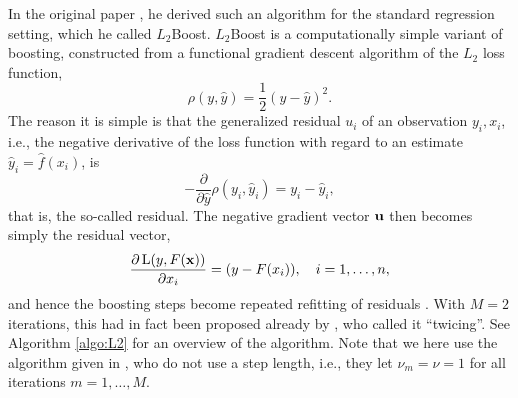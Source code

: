 In the original paper \citep{friedman2001}, he derived such an algorithm for the standard regression setting, which he called $L_2$Boost. $L_2$Boost is a computationally simple variant of boosting, constructed from a functional gradient descent algorithm of the $L_2$ loss function,
\begin{equation*}
    \rho(y, \hat{y})=\frac{1}{2}(y-\hat{y})^2.
\end{equation*}
The reason it is simple is that the generalized residual $u_i$ of an observation $y_i,x_i$, i.e., the negative derivative of the loss function with regard to an estimate $\hat{y}_i=\hat{f}(x_i)$, is
\begin{equation*}
    -\frac{\partial}{\partial\hat{y}}\rho(y_i, \hat{y}_i)=y_i-\hat{y}_i,
\end{equation*}
that is, the so-called residual. The negative gradient vector $\mathbf{u}$ then becomes simply the residual vector,
\begin{equation*}
    \frac{\partial\operatorname{L}(y,F(\mathbf{x}))}{\partial x_i}=(y-F(x_i)),\quad i=1,\dotsc,n,
\end{equation*}
and hence the boosting steps become repeated refitting of residuals \citep{friedman2001,buhlmann-yu}. With $M=2$ iterations, this had in fact been proposed already by \citep{tukey}, who called it ``twicing''. See Algorithm \ref{algo:L2} for an overview of the algorithm. Note that we here use the algorithm given in \citet{buhlmann-yu}, who do not use a step length, i.e., they let $\nu_m=\nu=1$ for all iterations $m=1,\ldots,M$.
